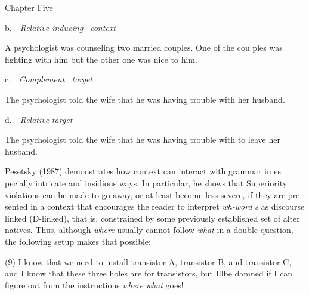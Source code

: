 \clearpage\setcounter{page}{1}\begin{styleStandard}
Chapter Five
\end{styleStandard}


\begin{styleStandard}
b.\ \ \textit{Relative-inducing }\textit{\ }\textit{context}
\end{styleStandard}


\begin{styleStandard}
A psychologist was counseling two married couples. One of the cou\- ples was fighting with him but the other one was nice to him.
\end{styleStandard}


\begin{styleStandard}
c.\ \ \textit{Complement \ target}
\end{styleStandard}


\begin{styleStandard}
The psychologist told the wife that he was having trouble with her husband.
\end{styleStandard}


\begin{styleStandard}
d.\ \ \textit{Relative}\textit{ }\textit{target}
\end{styleStandard}


\begin{styleStandard}
The psychologist told the wife that he was having trouble with to leave her husband.
\end{styleStandard}


\begin{styleStandard}
Pesetsky (1987) demonstrates how context can interact with grammar in es\- pecially intricate and insidious ways. In particular, he shows that Superiority violations can be made to go away, or at least become less severe, if they are pre\- sented in a context that encourages the reader to interpret \textit{wh-word}\textit{ }\textit{s}\textit{ }as discourse\- linked (D-linked), that is, constrained by some previously established set of alter\- natives. Thus, although \textit{where}\textit{ }usually cannot follow \textit{what}\textit{ }in a double question, the following setup makes that possible:
\end{styleStandard}


\begin{styleStandard}
(9) I know that we need to install transistor A, transistor B, and transistor C, and I know that these three holes are for transistors, but I{\textquotesingle}llbe damned if I can figure out from the instructions \textit{where}\textit{ }\textit{what}\textit{ }goes!
\end{styleStandard}


